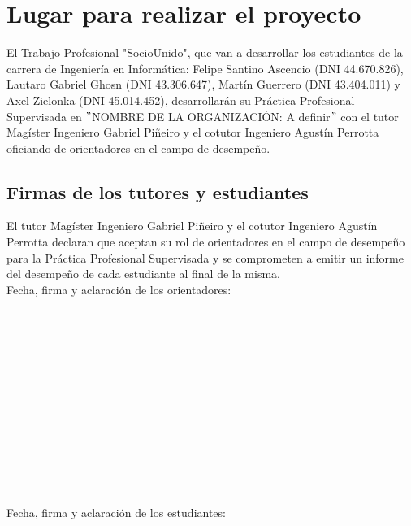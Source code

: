\section{Lugar para realizar el proyecto}

El Trabajo Profesional "SocioUnido", que van a desarrollar los estudiantes de la carrera de Ingeniería en Informática: Felipe Santino Ascencio (DNI 44.670.826), Lautaro Gabriel Ghosn (DNI 43.306.647), Martín Guerrero (DNI 43.404.011) y Axel Zielonka (DNI 45.014.452), desarrollarán su Práctica Profesional Supervisada en $"$NOMBRE DE LA ORGANIZACIÓN: A definir$"$ con el tutor Magíster Ingeniero Gabriel Piñeiro y el cotutor Ingeniero Agustín Perrotta oficiando de orientadores en el campo de desempeño.

\subsection{Firmas de los tutores y estudiantes}

El tutor Magíster Ingeniero Gabriel Piñeiro y el cotutor Ingeniero Agustín Perrotta declaran que aceptan su rol de orientadores en el campo de desempeño para la Práctica Profesional Supervisada y se comprometen a emitir un informe del desempeño de cada estudiante al final de la misma.
\\

Fecha, firma y aclaración de los orientadores: 
\\
\\
\\
\\
\\
\\
\\
\\
\\
\\
\\
\\
\\
\\

Fecha, firma y aclaración de los estudiantes: 
